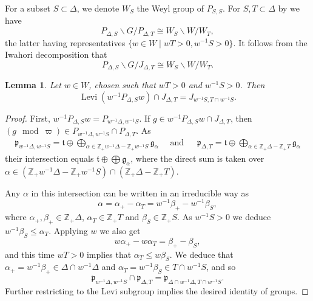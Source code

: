 \documentclass{amsart}
\newtheorem{lemma}[thm]{Lemma}
\theoremstyle{definition}
\begin{document}
{For a subset $S\subset \Delta$, we denote $W_S$ the Weyl group
of $P_{S,S}$. For  $S,T\subset \Delta$ by \cite[Prop 1.3.1]{casselman:book} we have 
\[P_{\Delta,S}\backslash G/P_{\Delta,T}\cong W_S\backslash
W/W_T,\]
the latter having representatives $\{w\in W\mid w T >0,
w^{-1}S>0\}$. It  follows  from the Iwahori decomposition that
\[P_{\Delta,S}\backslash G/J_{\Delta,T}\cong W_S\backslash
W/W_T.\]
\begin{lemma}\label{l:levi-parahoric}
Let $w\in W$, chosen such that $w T>0$ and $w^{-1}S>0$. Then
\[\operatorname{Levi}(w^{-1}P_{\Delta,S}w)\cap J_{\Delta,T}=J_{w^{-1}S,T\cap w^{-1}S}.\]
\end{lemma}
\begin{proof}
First, $w^{-1}P_{\Delta,S}w=P_{w^{-1}\Delta,w^{-1}S}$. If $g\in
w^{-1}P_{\Delta,S}w\cap J_{\Delta,T}$, then  $(g\mod\varpi)\in
P_{w^{-1}\Delta,w^{-1}S}\cap P_{\Delta,T}$. As 
\begin{align*}
\mathfrak{p}_{w^{-1}\Delta,w^{-1}S}=\mathfrak{t}\oplus\bigoplus_{\alpha\in
                                     \mathbb{Z}_{+}w^{-1}\Delta-\mathbb{Z}_{+}
                                     w^{-1}S}\mathfrak{g}_\alpha \quad \text{  and }~\quad
  \mathfrak{p}_{\Delta,T}=\mathfrak{t}\oplus\bigoplus_{\alpha\in \mathbb{Z}_{+}\Delta-\mathbb{Z}_{+}T}\mathfrak{g}_\alpha 
\end{align*}
their  intersection equals  $\mathfrak{t} \oplus\bigoplus\mathfrak{g}_\alpha$, where the direct sum is taken over 
$\alpha\in (\mathbb{Z}_{+}w^{-1}\Delta-\mathbb{Z}_{+}w^{-1}S)\cap (\mathbb{Z}_{+}\Delta-\mathbb{Z}_{+}T)$.

Any $\alpha$ in this intersection can be written in an irreducible way as
\[\alpha=\alpha_{+}-\alpha_T=w^{-1}\beta_{+}-w^{-1}\beta_S,\]
where $\alpha_{+},\beta_{+}\in \mathbb{Z}_{+}\Delta$, $\alpha_T\in \mathbb{Z}_{+}T$ and  $\beta_S\in \mathbb{Z}_{+}S$.  
As $w^{-1}S>0$ we deduce  $ w^{-1}\beta_S\leqslant \alpha_T$. Applying $w$ we also get
\[w\alpha_+-w\alpha_T=\beta_+-\beta_S,\]
and this time $w T>0$ implies that $\alpha_T \leqslant w \beta_S$. 
We  deduce that $\alpha_+=w^{-1} \beta_+\in \Delta\cap w^{-1}\Delta$ and $\alpha_T=w^{-1} \beta_S \in T\cap w^{-1}S$,  and so
\[\mathfrak{p}_{w^{-1}\Delta,w^{-1}S}\cap \mathfrak{p}_{\Delta,T}=\mathfrak{p}_{\Delta\cap
  w^{-1}\Delta,T\cap w^{-1}S}.\]
Further restricting to the Levi subgroup implies the desired identity of groups. 
\end{proof}

}
\end{document}
